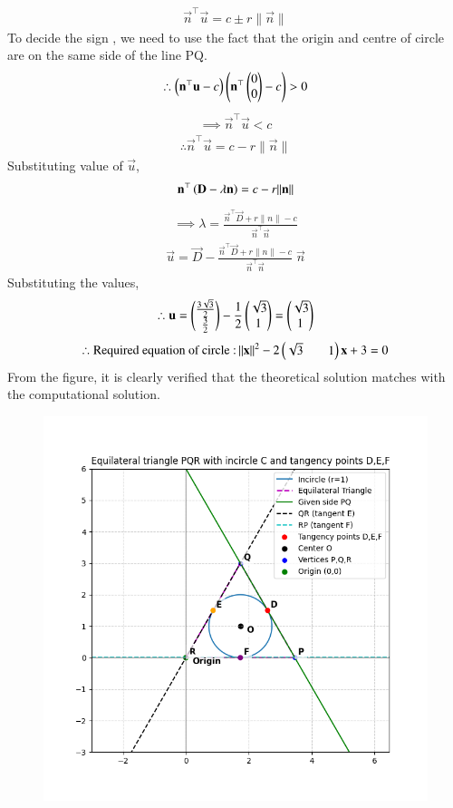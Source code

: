 \documentclass[journal]{IEEEtran}
\begin{document}
\begin{align}
    \vec{n}^{\top}\vec{u}=c \pm r\|\vec{n}\|
\end{align}
\newpage
\vspace*{0.25cm}
To decide the sign , we need to use the fact that the origin and centre of circle are on the same side of the line PQ.
\begin{align}
    \therefore \left(\mathbf{n}^{\top}\mathbf{u}-c\right)\left(\mathbf{n}^{\top}\begin{pmatrix}0\\0\end{pmatrix}-c\right)>0
\end{align}
\begin{align}
    \implies \vec{n}^{\top}\vec{u}<c
\end{align}
\begin{align}
    \therefore \vec{n}^{\top}\vec{u}=c-r\|\vec{n}\|
\end{align}
Substituting value of $\vec{u}$,
\begin{align}
\mathbf{n}^{\top}\left(\mathbf{D}-\lambda\mathbf{n}\right)=c-r\|\mathbf{n}\|
\end{align}
\begin{align}
    \implies \lambda=\frac{\vec{n}^{\top}\vec{D}+r\|n\|-c}{\vec{n}^{\top}\vec{n}}
\end{align}
\begin{align}
    \vec{u}=\vec{D}-\frac{\vec{n}^{\top}\vec{D}+r\|n\|-c}{\vec{n}^{\top}\vec{n}}\;\vec{n}
\end{align}
Substituting the values,
\begin{align}
    \therefore \mathbf{u}=\begin{pmatrix}\frac{3\sqrt{3}}{2}\\\frac{3}{2}\end{pmatrix}
-\frac{1}{2}\begin{pmatrix}\sqrt{3}\\1\end{pmatrix}=\begin{pmatrix}\sqrt{3}\\1\end{pmatrix}
\end{align}
\begin{align}
    \therefore \text{Required equation of circle :\,}\|\mathbf{x}\|^2-2\begin{pmatrix}\sqrt{3}&&1\end{pmatrix}\mathbf{x}+3=0
\end{align}
From the figure, it is clearly verified that the theoretical solution matches with the computational solution.\\
\begin{figure}[H]
    \centering
    \includegraphics[width=0.4\columnwidth]{figs/Figure_1.png}
    \label{fig:1}
\end{figure}
\end{document}
